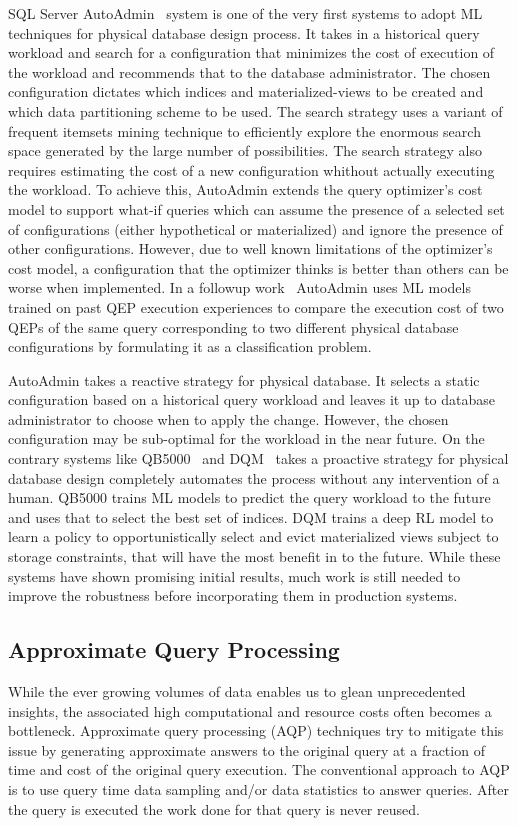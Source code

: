 SQL Server AutoAdmin~\cite{autoadmin} system is one of the very first systems to adopt ML techniques for physical database design process.
It takes in a historical query workload and search for a configuration that minimizes the cost of execution of the workload and recommends that to the database administrator.
The chosen configuration dictates which indices and materialized-views to be created and which data partitioning scheme to be used.
The search strategy uses a variant of frequent itemsets mining technique to efficiently explore the enormous search space generated by the large number of possibilities.
The search strategy also requires estimating the cost of a new configuration whithout actually executing the workload.
To achieve this, AutoAdmin extends the query optimizer's cost model to support what-if queries which can assume the presence of a selected set of configurations (either hypothetical or materialized) and ignore the presence of other configurations.
However, due to well known limitations of the optimizer's cost model, a configuration that the optimizer thinks is better than others can be worse when implemented.
In a followup work~\cite{autoadmin_2} AutoAdmin uses ML models trained on past QEP execution experiences to compare the execution cost of two QEPs of the same query corresponding to two different physical database configurations by formulating it as a classification problem.

AutoAdmin takes a reactive strategy for physical database. 
It selects a static configuration based on a historical query workload and leaves it up to database administrator to choose when to apply the change.
However, the chosen configuration may be sub-optimal for the workload in the near future.
On the contrary systems like QB5000~\cite{qb5000} and DQM~\cite{dqm} takes a proactive strategy for physical database design completely automates the process without any intervention of a human.
QB5000 trains ML models to predict the query workload to the future and uses that to select the best set of indices.
DQM trains a deep RL model to learn a policy to opportunistically select and evict materialized views subject to storage constraints, that will have the most benefit in to the future.
While these systems have shown promising initial results, much work is still needed to improve the robustness before incorporating them in production systems.





\subsection{Approximate Query Processing}
While the ever growing volumes of data enables us to glean unprecedented insights, the associated high computational and resource costs often becomes a bottleneck.
Approximate query processing (AQP) techniques try to mitigate this issue by generating approximate answers to the original query at a fraction of time and cost of the original query execution.
The conventional approach to AQP is to use query time data sampling and/or data statistics to answer queries.
After the query is executed the work done for that query is never reused.

